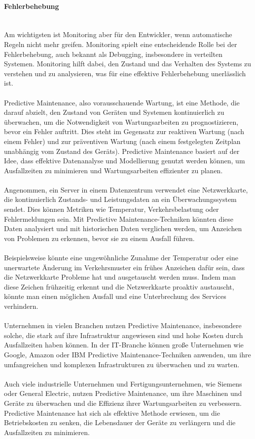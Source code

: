 \documentclass[../vs-script-first-v01.tex]{subfiles}
\begin{document}
\paragraph{Fehlerbehebung\\\\}
Am wichtigsten ist Monitoring aber für den Entwickler, wenn automatische Regeln nicht mehr greifen. Monitoring spielt eine entscheidende Rolle bei der Fehlerbehebung, auch bekannt als Debugging, insbesondere in verteilten Systemen. Monitoring hilft dabei, den Zustand und das Verhalten des Systems zu verstehen und zu analysieren, was für eine effektive Fehlerbehebung unerlässlich ist.
\\\\
Predictive Maintenance, also vorausschauende Wartung, ist eine Methode, die darauf abzielt, den Zustand von Geräten und Systemen kontinuierlich zu überwachen, um die Notwendigkeit von Wartungsarbeiten zu prognostizieren, bevor ein Fehler auftritt. Dies steht im Gegensatz zur reaktiven Wartung (nach einem Fehler) und zur präventiven Wartung (nach einem festgelegten Zeitplan unabhängig vom Zustand des Geräts). Predictive Maintenance basiert auf der Idee, dass effektive Datenanalyse und Modellierung genutzt werden können, um Ausfallzeiten zu minimieren und Wartungsarbeiten effizienter zu planen.
\\\\
Angenommen, ein Server in einem Datenzentrum verwendet eine Netzwerkkarte, die kontinuierlich Zustands- und Leistungsdaten an ein Überwachungssystem sendet. Dies können Metriken wie Temperatur, Verkehrsbelastung oder Fehlermeldungen sein. Mit Predictive Maintenance-Techniken könnten diese Daten analysiert und mit historischen Daten verglichen werden, um Anzeichen von Problemen zu erkennen, bevor sie zu einem Ausfall führen.
\\\\
Beispielsweise könnte eine ungewöhnliche Zunahme der Temperatur oder eine unerwartete Änderung im Verkehrsmuster ein frühes Anzeichen dafür sein, dass die Netzwerkkarte Probleme hat und ausgetauscht werden muss. Indem man diese Zeichen frühzeitig erkennt und die Netzwerkkarte proaktiv austauscht, könnte man einen möglichen Ausfall und eine Unterbrechung des Services verhindern.
\\\\
Unternehmen in vielen Branchen nutzen Predictive Maintenance, insbesondere solche, die stark auf ihre Infrastruktur angewiesen sind und hohe Kosten durch Ausfallzeiten haben können. In der IT-Branche können große Unternehmen wie Google, Amazon oder IBM Predictive Maintenance-Techniken anwenden, um ihre umfangreichen und komplexen Infrastrukturen zu überwachen und zu warten.
\\\\
Auch viele industrielle Unternehmen und Fertigungsunternehmen, wie Siemens oder General Electric, nutzen Predictive Maintenance, um ihre Maschinen und Geräte zu überwachen und die Effizienz ihrer Wartungsarbeiten zu verbessern. Predictive Maintenance hat sich als effektive Methode erwiesen, um die Betriebskosten zu senken, die Lebensdauer der Geräte zu verlängern und die Ausfallzeiten zu minimieren.
\end{document}
